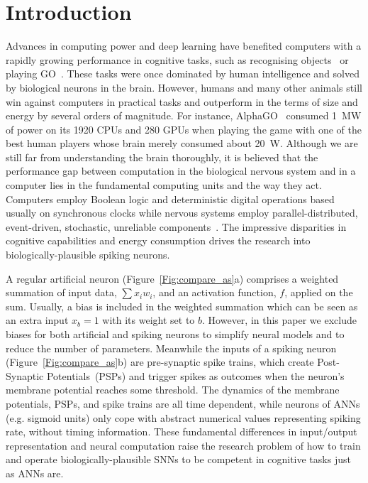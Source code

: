 \documentclass{article}
\begin{document}
\section{Introduction}
Advances in computing power and deep learning have benefited computers with a rapidly growing performance in cognitive tasks, such as recognising objects~\cite{deng2009imagenet} or playing GO~\cite{silver2016mastering}. 
These tasks were once dominated by human intelligence and solved by biological neurons in the brain.
However, humans and many other animals still win against computers in practical tasks and outperform in the terms of size and energy by several orders of magnitude.
For instance, AlphaGO~\cite{silver2016mastering} consumed 1~MW of power on its 1920 CPUs and 280 GPUs when playing the game with one of the best human players whose brain merely consumed about 20~W.
Although we are still far from understanding the brain thoroughly, it is believed that the performance gap between computation in the biological nervous system and in a computer lies in the fundamental computing units and the way they act.
Computers employ Boolean logic and deterministic digital operations based usually on synchronous clocks while nervous systems employ parallel-distributed, event-driven, stochastic, unreliable components~\cite{indiveri2009artificial}.
The impressive disparities in cognitive capabilities and energy consumption drives the research into biologically-plausible spiking neurons.

A regular artificial neuron (Figure~\ref{Fig:compare_as}a) comprises a weighted summation of input data, $\sum x_i w_i$, and an activation function, $f$, applied on the sum.
Usually, a bias is included in the weighted summation which can be seen as an extra input $x_b = 1$ with its weight set to $b$.
However, in this paper we exclude biases for both artificial and spiking neurons to simplify neural models and to reduce the number of parameters.
Meanwhile the inputs of a spiking neuron (Figure~\ref{Fig:compare_as}b) are pre-synaptic spike trains, which create Post-Synaptic Potentials~(PSPs) and trigger spikes as outcomes when the neuron's membrane potential reaches some threshold.
The dynamics of the membrane potentials, PSPs, and spike trains are all time dependent, while neurons of ANNs (e.g. sigmoid units) only cope with abstract numerical values representing spiking rate, without timing information.
These fundamental differences in input/output representation and neural computation raise the research problem of how to train and operate biologically-plausible SNNs to be competent in cognitive tasks just as ANNs are.
\end{document}
